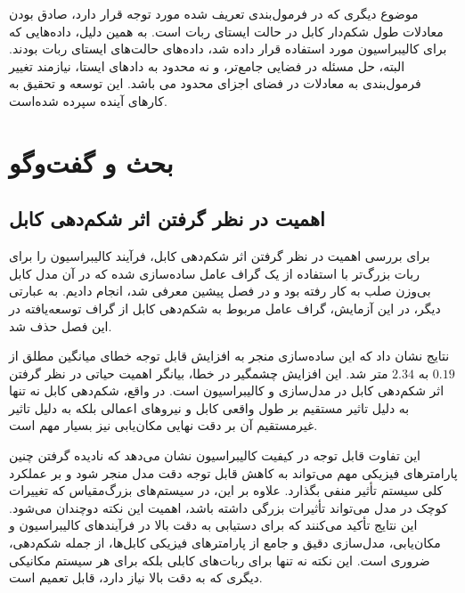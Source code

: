 موضوع دیگری که در فرمول‌بندی تعریف شده مورد توجه قرار دارد، صادق بودن معادلات طول شکم‌دار کابل در حالت ایستای ربات است. به همین دلیل، داده‌هایی که برای کالیبراسیون مورد استفاده قرار داده‌ شد، داده‌‌های حالت‌های ایستای ربات بودند. البته، حل مسئله در فضایی جامع‌تر، و نه محدود به داد‌های ایستا، نیازمند تغییر فرمول‌بندی به معادلات در فضای اجزای محدود می باشد. این توسعه و تحقیق به کارهای آینده سپرده شده‌است.


\section{بحث و گفت‌وگو} \label{sec:discussion}

\subsection{اهمیت در نظر گرفتن اثر شکم‌دهی کابل}
برای بررسی اهمیت در نظر گرفتن اثر شکم‌دهی کابل، فرآیند کالیبراسیون را برای ربات بزرگ‌تر با استفاده از یک گراف عامل ساده‌سازی شده که در آن مدل کابل بی‌وزن صلب به کار رفته بود و در فصل پیشین معرفی شد، انجام دادیم. به عبارتی دیگر، در این آزمایش، گراف عامل مربوط به شکم‌دهی کابل از گراف توسعه‌یافته در این فصل حذف شد. 

نتایج نشان داد که این ساده‌سازی منجر به افزایش قابل توجه خطای میانگین مطلق از $0.19$ به $2.34$ متر شد. این افزایش چشمگیر در خطا، بیانگر اهمیت حیاتی در نظر گرفتن اثر شکم‌دهی کابل در مدل‌سازی و کالیبراسیون است. در واقع، شکم‌دهی کابل نه تنها به دلیل تاثیر مستقیم بر طول واقعی کابل و نیروهای اعمالی بلکه به دلیل تاثیر غیرمستقیم آن بر دقت نهایی مکان‌یابی نیز بسیار مهم است.

این تفاوت قابل توجه در کیفیت کالیبراسیون نشان می‌دهد که نادیده گرفتن چنین پارامترهای فیزیکی مهم می‌تواند به کاهش قابل توجه دقت مدل منجر شود و بر عملکرد کلی سیستم تأثیر منفی بگذارد. علاوه بر این، در سیستم‌های بزرگ‌مقیاس که تغییرات کوچک در مدل می‌تواند تأثیرات بزرگی داشته باشد، اهمیت این نکته دوچندان می‌شود. این نتایج تأکید می‌کنند که برای دستیابی به دقت بالا در فرآیندهای کالیبراسیون و مکان‌یابی، مدل‌سازی دقیق و جامع از پارامترهای فیزیکی کابل‌ها، از جمله شکم‌دهی، ضروری است. این نکته نه تنها برای ربات‌های کابلی بلکه برای هر سیستم مکانیکی دیگری که به دقت بالا نیاز دارد، قابل تعمیم است.


